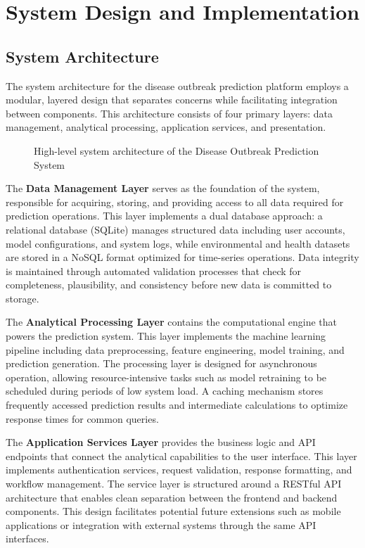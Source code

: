\documentclass[12pt,a4paper]{report}
\begin{document}
\chapter{System Design and Implementation}
\section{System Architecture}
The system architecture for the disease outbreak prediction platform employs a modular, layered design that separates concerns while facilitating integration between components. This architecture consists of four primary layers: data management, analytical processing, application services, and presentation.

\begin{figure}[h]
\centering
\caption{High-level system architecture of the Disease Outbreak Prediction System}
\label{fig:system_architecture}
\end{figure}

The \textbf{Data Management Layer} serves as the foundation of the system, responsible for acquiring, storing, and providing access to all data required for prediction operations. This layer implements a dual database approach: a relational database (SQLite) manages structured data including user accounts, model configurations, and system logs, while environmental and health datasets are stored in a NoSQL format optimized for time-series operations. Data integrity is maintained through automated validation processes that check for completeness, plausibility, and consistency before new data is committed to storage.

The \textbf{Analytical Processing Layer} contains the computational engine that powers the prediction system. This layer implements the machine learning pipeline including data preprocessing, feature engineering, model training, and prediction generation. The processing layer is designed for asynchronous operation, allowing resource-intensive tasks such as model retraining to be scheduled during periods of low system load. A caching mechanism stores frequently accessed prediction results and intermediate calculations to optimize response times for common queries.

The \textbf{Application Services Layer} provides the business logic and API endpoints that connect the analytical capabilities to the user interface. This layer implements authentication services, request validation, response formatting, and workflow management. The service layer is structured around a RESTful API architecture that enables clean separation between the frontend and backend components. This design facilitates potential future extensions such as mobile applications or integration with external systems through the same API interfaces.
\end{document}
